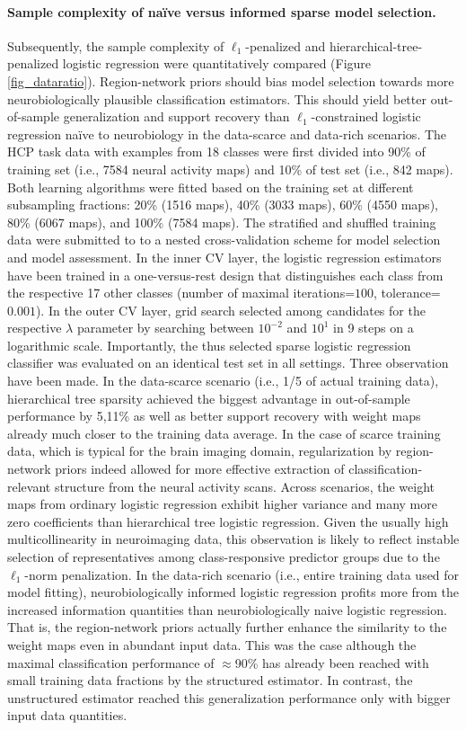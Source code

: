 \documentclass{article} %
\begin{document}
\paragraph{Sample complexity of na\"ive versus informed sparse model selection.}
Subsequently, the sample complexity of
$\ell_1$-penalized and hierarchical-tree-penalized logistic regression
were quantitatively compared (Figure \ref{fig_dataratio}).
Region-network priors should bias model selection towards more
neurobiologically plausible classification estimators.
This should yield better out-of-sample generalization and
support recovery than
$\ell_1$-constrained logistic regression na\"ive to neurobiology
in the data-scarce and data-rich scenarios.
%
The HCP task data with examples from 18 classes were first divided into
90\% of training set (i.e., 7584 neural activity maps) and
10\% of test set (i.e., 842 maps).
Both learning algorithms were fitted based on the
training set at different subsampling fractions:
20\% (1516 maps),
40\% (3033 maps),
60\% (4550 maps),
80\% (6067 maps), and
100\% (7584 maps).
%
The stratified and shuffled training data were submitted to
to a nested cross-validation scheme
for model selection and model assessment.
In the inner CV layer, the logistic regression estimators
have been trained in a one-versus-rest design that
distinguishes each class from
the respective 17 other classes
(number of maximal iterations=$100$, tolerance=$0.001$).
In the outer CV layer, grid search
selected among candidates for the respective $\lambda$ parameter
by searching between $10^{-2}$ and $10^{1}$ in 9 steps on a logarithmic scale.
Importantly, the thus selected sparse logistic regression classifier was
evaluated on an identical test set in all settings.
%
Three observation have been made.
In the data-scarce scenario (i.e., 1/5 of actual training data),
hierarchical tree sparsity achieved the biggest advantage
in out-of-sample performance by 5,11\% as well as
better support recovery with weight maps already much closer
to the training data average.
In the case of scarce training data, which is typical for the brain imaging domain,
regularization by region-network priors indeed allowed for
more effective extraction of classification-relevant structure
from the neural activity scans.
%
Across scenarios,
the weight maps from ordinary logistic regression exhibit
higher variance and many more zero coefficients
than hierarchical tree logistic regression.
Given the usually high multicollinearity in neuroimaging data,
this observation is likely to reflect instable selection of
representatives among class-responsive predictor groups
due to the $\ell_1$-norm penalization.
%
In the data-rich scenario (i.e., entire training data used for model fitting),
neurobiologically informed logistic regression
profits more from the increased information quantities than
neurobiologically naive logistic regression.
That is, the region-network priors actually further enhance the similarity
to the weight maps even in abundant input data.
This was the case although
the maximal classification performance of $\approx$90\% has already
been reached with small training data fractions by the structured estimator.
In contrast, 
the unstructured estimator reached this generalization performance
only with bigger input data quantities.
\end{document}
